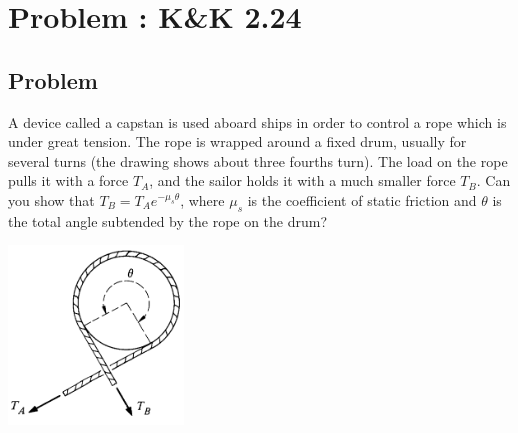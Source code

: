 \documentclass[solutions]{esg8012pset}
\date{September 24}
\begin{document}
\section{Problem \thesection: K\&K 2.24}
\subsection{Problem}
  A device called a capstan is used aboard ships in order to control a rope which is under great tension. The rope is wrapped around a fixed drum, usually for several turns (the drawing shows about three fourths turn). The load on the rope pulls it with a force $T_A$, and the sailor holds it with a much smaller force $T_B$.  Can you show that $T_B = T_Ae^{-\mu_s\theta}$, where $\mu_s$ is the coefficient of static friction and $\theta$ is the total angle subtended by the rope on the drum?
  \begin{center}\includegraphics[width=0.35\textwidth]{ps03_1}\end{center}
\end{document}
